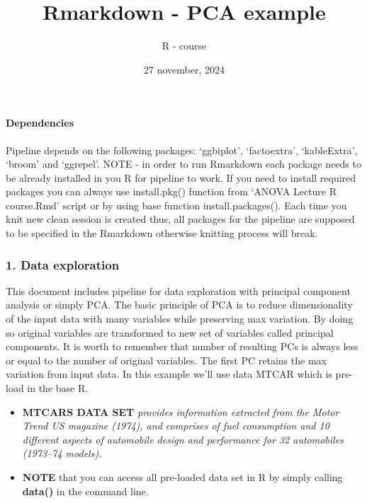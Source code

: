 \documentclass[
  5pt,
]{article}
\title{Rmarkdown - PCA example}
\author{R - course}
\date{27 november, 2024}
\begin{document}
\maketitle

\paragraph{Dependencies}\label{dependencies}

Pipeline depends on the following packages: `ggbiplot', `factoextra',
`kableExtra', `broom' and `ggrepel'. NOTE - in order to run Rmarkdown
each package needs to be already installed in you R for pipeline to
work. If you need to install required packages you can always use
install.pkg() function from `ANOVA Lecture R course.Rmd' script or by
using base function install.packages(). Each time you knit new clean
session is created thus, all packages for the pipeline are supposed to
be specified in the Rmarkdown otherwise knitting process will break.

\subsubsection{1. Data exploration}\label{data-exploration}

This document includes pipeline for data exploration with principal
component analysis or simply PCA. The basic principle of PCA is to
reduce dimensionality of the input data with many variables while
preserving max variation. By doing so original variables are transformed
to new set of variables called principal components. It is worth to
remember that number of resulting PCs is always less or equal to the
number of original variables. The first PC retains the max variation
from input data. In this example we'll use data MTCAR which is pre-load
in the base R.

\begin{itemize}
\item
  \textbf{MTCARS DATA SET} \emph{provides information extracted from the
  Motor Trend US magazine (1974), and comprises of fuel consumption and
  10 different aspects of automobile design and performance for 32
  automobiles (1973--74 models).}
\item
  \textbf{NOTE} that you can access all pre-loaded data set in R by
  simply calling \textbf{data()} in the command line.
\end{itemize}
\end{document}
